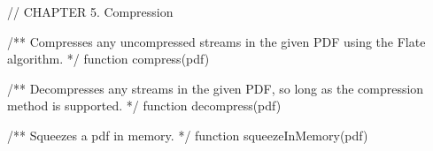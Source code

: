 // CHAPTER 5. Compression

/** Compresses any uncompressed streams in the given PDF using the Flate
algorithm. */
function compress(pdf)

/** Decompresses any streams in the given PDF, so long as the compression
method is supported. */
function decompress(pdf)

/** Squeezes a pdf in memory. */
function squeezeInMemory(pdf)
